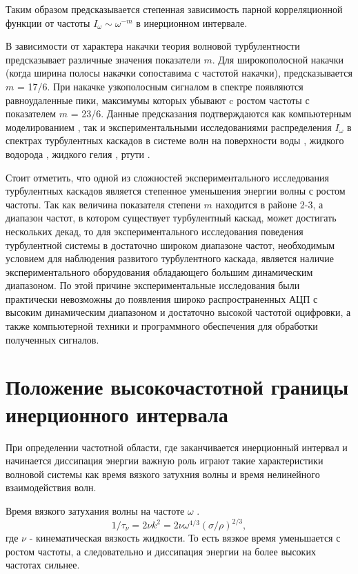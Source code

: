 Таким образом предсказывается степенная зависимость парной корреляционной функции от частоты $I_\omega \sim \omega^{-m}$ в инерционном интервале.

В зависимости от характера накачки теория волновой турбулентности предсказывает различные значения показатели $m$. Для широкополосной накачки (когда ширина полосы накачки сопоставима с частотой накачки), предсказывается $m$ = 17/6. При накачке узкополосным сигналом в спектре появляются равноудаленные пики, максимумы которых убывают c ростом частоты с показателем $m$ = 23/6. Данные предсказания подтверждаются как компьютерным моделированием \cite{Babiano1995, Babiano1987, Falcovich1988, Pushkarev1996}, так и экспериментальными исследованиями распределения $I_\omega$
в спектрах турбулентных каскадов в системе волн на поверхности воды \cite{BrazhnikovWater}, жидкого водорода \cite{Brazhnikov2001}, жидкого гелия \cite{Abdurakhimov2007}, ртути \cite{Falcon2007}.

Стоит отметить, что одной из сложностей экспериментального исследования турбулентных каскадов является степенное уменьшения энергии волны с ростом частоты. Так как величина показателя степени $m$ находится в районе 2-3, а диапазон частот, в котором существует турбулентный каскад, может достигать нескольких декад, то для экспериментального исследования поведения турбулентной системы в достаточно широком диапазоне частот, необходимым условием для наблюдения развитого турбулентного каскада, является наличие экспериментального оборудования обладающего большим динамическим диапазоном. По этой причине экспериментальные исследования были практически невозможны до появления широко распространенных АЦП с высоким динамическим диапазоном и достаточно высокой частотой оцифровки, а также компьютерной техники и программного обеспечения для обработки полученных сигналов.

\section{Положение высокочастотной границы инерционного интервала}\label{subsect_hiFreqBound}

При определении частотной области, где заканчивается инерционный интервал и начинается диссипация энергии важную роль играют такие характеристики волновой системы как время вязкого затухния волны и время нелинейного взаимодействия волн.

Время вязкого затухания волны на частоте $\omega$ \cite[стр. 135]{land}.
\begin{equation}
\label{eq:tauNu}
1/\tau_\nu = 2\nu k^2 = 2 \nu \omega^{4/3}(\sigma/\rho)^{2/3},
\end{equation}
где $\nu$ - кинематическая вязкость жидкости.
То есть вязкое время уменьшается с ростом частоты, а следовательно и диссипация энергии на более высоких частотах сильнее.


